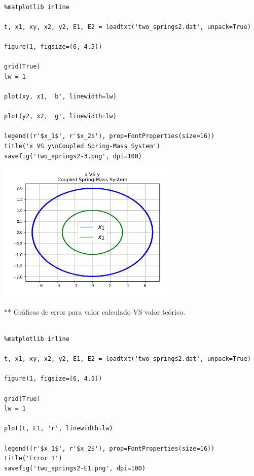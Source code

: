 \documentclass{article} %
\begin{document}
\begin{verbatim} 

%matplotlib inline

t, x1, xy, x2, y2, E1, E2 = loadtxt('two_springs2.dat', unpack=True)

figure(1, figsize=(6, 4.5))

grid(True)
lw = 1

plot(xy, x1, 'b', linewidth=lw)

plot(y2, x2, 'g', linewidth=lw)

legend((r'$x_1$', r'$x_2$'), prop=FontProperties(size=16))
title('x VS y\nCoupled Spring-Mass System')
savefig('two_springs2-3.png', dpi=100)

\end{verbatim}



\begin{center}
 	\includegraphics[width=9cm]{two_springs2-3.png}
 \end{center}



** Gráficas de error para valor calculado VS valor teórico.


\begin{verbatim} 

%matplotlib inline

t, x1, xy, x2, y2, E1, E2 = loadtxt('two_springs2.dat', unpack=True)

figure(1, figsize=(6, 4.5))

grid(True)
lw = 1

plot(t, E1, 'r', linewidth=lw)

legend((r'$x_1$', r'$x_2$'), prop=FontProperties(size=16))
title('Error 1')
savefig('two_springs2-E1.png', dpi=100)

\end{verbatim}
\end{document}
